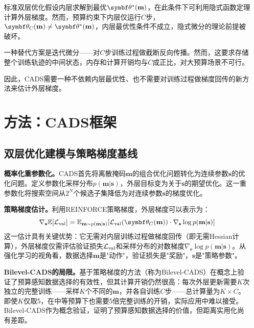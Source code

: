 标准双层优化假设内层求解到最优$\btheta^*(\mathbf{m})$，在此条件下可利用隐式函数定理\cite{domke2012generic, grazzi2020iteration}计算外层梯度。然而，预算约束下内层仅运行$C$步，$\btheta_C(\mathbf{m}) \neq \btheta^*(\mathbf{m})$，内层最优性条件不成立，隐式微分的理论前提被破坏。

一种替代方案是迭代微分\cite{maclaurin2015gradient, shaban2019truncated}——对$C$步训练过程做截断反向传播。然而，这要求存储整个训练轨迹的中间状态，内存和计算开销均与$C$成正比\cite{chen2016training}，对大预算场景不可行。

因此，CADS需要一种不依赖内层最优性、也不需要对训练过程做梯度回传的新方法来估计外层梯度。


\section{方法：CADS框架}

\subsection{双层优化建模与策略梯度基线}

\textbf{概率化重参数化。}CADS首先将离散掩码$\mathbf{m}$的组合优化问题转化为连续参数$\mathbf{s}$的优化问题。定义参数化采样分布$p(\mathbf{m}|\mathbf{s})$，外层目标变为关于$\mathbf{s}$的期望优化。这一重参数化将搜索空间从$2^N$个候选子集降低为对连续参数$\mathbf{s}$的梯度优化。

\textbf{策略梯度估计。}利用REINFORCE策略梯度\cite{zhou2022probabilistic}，外层梯度可以表示为：
\begin{equation}\label{eq:cads-reinforce}
  \nabla_{\mathbf{s}}\mathbb{E}[\Lval] = \mathbb{E}_{\mathbf{m} \sim p(\mathbf{m}|\mathbf{s})}[\Lval(\btheta_C(\mathbf{m})) \cdot \nabla_{\mathbf{s}} \log p(\mathbf{m}|\mathbf{s})]
\end{equation}
这一估计具有关键优势：它无需对内层训练过程做梯度回传（即无需Hessian计算），外层梯度仅需评估验证损失$\mathcal{L}_{\text{val}}$和采样分布的对数梯度$\nabla_{\mathbf{s}} \log p(\mathbf{m}|\mathbf{s})$。从强化学习的视角看，数据选择$\mathbf{m}$是"动作"，验证损失是"奖励"，$\mathbf{s}$是"策略参数"。

\textbf{Bilevel-CADS的局限。}基于策略梯度的方法（称为Bilevel-CADS）在概念上验证了预算感知数据选择的有效性，但其计算开销仍然很高：每次外层更新需要$K$次独立的完整训练——采样$K$个不同的$\mathbf{m}$，并各自训练$C$步——总计算量为$K \times C$。即使$K$仅取5，在中等预算下也需要5倍完整训练的开销，实际应用中难以接受。Bilevel-CADS作为概念验证，证明了预算感知数据选择的价值，但距离实用化尚有差距。


